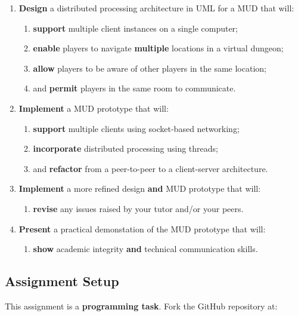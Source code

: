 \documentclass{../../fal_assignment}
\begin{document}
\begin{enumerate}[label=(\Alph*)]
    \item \textbf{Design} a distributed processing architecture in UML for a MUD that will:
    	\begin{enumerate}[label=\roman*.]
    		\item \textbf{support} multiple client instances on a single computer;
    		\item \textbf{enable} players to navigate \textbf{multiple} locations in a virtual dungeon;
    		\item \textbf{allow} players to be aware of other players in the same location;
    		\item and \textbf{permit} players in the same room to communicate.
	\end{enumerate}
    \item \textbf{Implement} a MUD prototype that will:
    	\begin{enumerate}[label=\roman*.]
    		\item \textbf{support} multiple clients using socket-based networking;
    		\item \textbf{incorporate} distributed processing using threads;
     		\item and \textbf{refactor} from a peer-to-peer to a client-server architecture.
	\end{enumerate}
    \item \textbf{Implement} a more refined design \textbf{and} MUD prototype that will:
    	\begin{enumerate}[label=\roman*.]
    		\item \textbf{revise} any issues raised by your tutor and/or your peers.
	\end{enumerate}
    \item \textbf{Present} a practical demonstation of the MUD prototype that will:
    	\begin{enumerate}[label=\roman*.]
    		\item \textbf{show} academic integrity \textbf{and} technical communication skills.
	\end{enumerate}
\end{enumerate}

\subsection*{Assignment Setup}

This assignment is a \textbf{programming task}. Fork the GitHub repository at:
\end{document}

